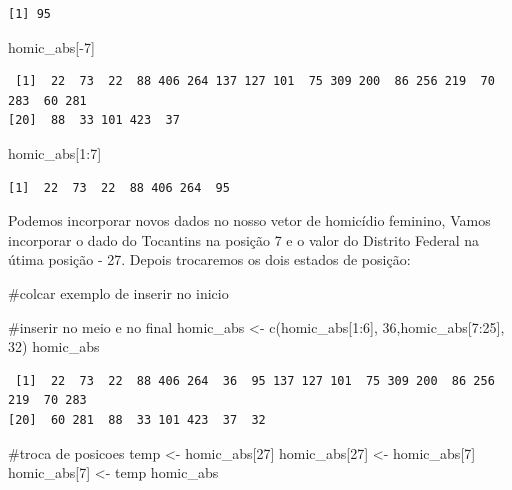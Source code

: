 \documentclass[
  letterpaper,
  DIV=11,
  numbers=noendperiod]{scrreprt}
\newenvironment{Shaded}{\begin{snugshade}}{\end{snugshade}}
\newcommand{\CommentTok}[1]{\textcolor[rgb]{0.37,0.37,0.37}{#1}}
\newcommand{\DecValTok}[1]{\textcolor[rgb]{0.68,0.00,0.00}{#1}}
\newcommand{\FunctionTok}[1]{\textcolor[rgb]{0.28,0.35,0.67}{#1}}
\newcommand{\NormalTok}[1]{\textcolor[rgb]{0.00,0.23,0.31}{#1}}
\newcommand{\OtherTok}[1]{\textcolor[rgb]{0.00,0.23,0.31}{#1}}
\newcommand{\SpecialCharTok}[1]{\textcolor[rgb]{0.37,0.37,0.37}{#1}}
\begin{document}
\begin{verbatim}
[1] 95
\end{verbatim}

\begin{Shaded}
\begin{Highlighting}[]
\NormalTok{homic\_abs[}\SpecialCharTok{{-}}\DecValTok{7}\NormalTok{] }
\end{Highlighting}
\end{Shaded}

\begin{verbatim}
 [1]  22  73  22  88 406 264 137 127 101  75 309 200  86 256 219  70 283  60 281
[20]  88  33 101 423  37
\end{verbatim}

\begin{Shaded}
\begin{Highlighting}[]
\NormalTok{homic\_abs[}\DecValTok{1}\SpecialCharTok{:}\DecValTok{7}\NormalTok{]}
\end{Highlighting}
\end{Shaded}

\begin{verbatim}
[1]  22  73  22  88 406 264  95
\end{verbatim}

Podemos incorporar novos dados no nosso vetor de homicídio feminino,
Vamos incorporar o dado do Tocantins na posição 7 e o valor do Distrito
Federal na útima posição - 27. Depois trocaremos os dois estados de
posição:

\begin{Shaded}
\begin{Highlighting}[]
\CommentTok{\#colcar exemplo de inserir no inicio}

\CommentTok{\#inserir no meio e no final }
\NormalTok{homic\_abs }\OtherTok{\textless{}{-}} \FunctionTok{c}\NormalTok{(homic\_abs[}\DecValTok{1}\SpecialCharTok{:}\DecValTok{6}\NormalTok{], }\DecValTok{36}\NormalTok{,homic\_abs[}\DecValTok{7}\SpecialCharTok{:}\DecValTok{25}\NormalTok{], }\DecValTok{32}\NormalTok{)}
\NormalTok{homic\_abs}
\end{Highlighting}
\end{Shaded}

\begin{verbatim}
 [1]  22  73  22  88 406 264  36  95 137 127 101  75 309 200  86 256 219  70 283
[20]  60 281  88  33 101 423  37  32
\end{verbatim}

\begin{Shaded}
\begin{Highlighting}[]
\CommentTok{\#troca de posicoes}
\NormalTok{temp }\OtherTok{\textless{}{-}}\NormalTok{ homic\_abs[}\DecValTok{27}\NormalTok{]}
\NormalTok{homic\_abs[}\DecValTok{27}\NormalTok{] }\OtherTok{\textless{}{-}}\NormalTok{ homic\_abs[}\DecValTok{7}\NormalTok{]}
\NormalTok{homic\_abs[}\DecValTok{7}\NormalTok{] }\OtherTok{\textless{}{-}}\NormalTok{ temp}
\NormalTok{homic\_abs}
\end{Highlighting}
\end{Shaded}
\end{document}
